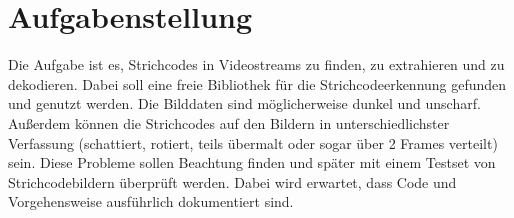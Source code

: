 \section{Aufgabenstellung}
Die Aufgabe ist es, Strichcodes in Videostreams zu finden, zu extrahieren und zu dekodieren.
Dabei soll eine freie Bibliothek für die Strichcodeerkennung gefunden und genutzt werden.
Die Bilddaten sind möglicherweise dunkel und unscharf.
Außerdem können die Strichcodes auf den Bildern in unterschiedlichster Verfassung (schattiert, rotiert, teils übermalt oder sogar über 2 Frames verteilt) sein.
Diese Probleme sollen Beachtung finden und später mit einem Testset von Strichcodebildern überprüft werden.
Dabei wird erwartet, dass Code und Vorgehensweise ausführlich dokumentiert sind.

